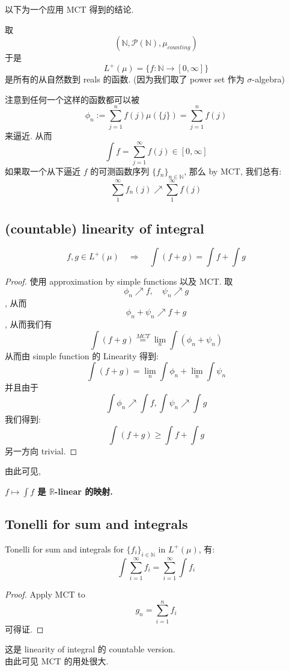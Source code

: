 \documentclass[lang=cn,11pt]{elegantbook}
\begin{document}
以下为一个应用 MCT 得到的结论.

\begin{example}
    取 $$(\mathbb{N}, \mathcal{P}(\mathbb{N}), \mu_{counting})$$
    于是$$L^+(\mu) = \{f:\mathbb{N}\rightarrow [0,\infty]  \}$$
    是所有的从自然数到 reals 的函数. (因为我们取了 power set 作为 $\sigma$-algebra)

   \noindent  注意到任何一个这样的函数都可以被 $$\phi_n :=  \sum_{j=1}^n f(j) \mu(\{j\}) =  \sum_{j=1}^n f(j)   $$ 来逼近. 从而 $$
    \int f = \sum_{j=1}^\infty f(j)  \in [0,\infty]
    $$ 
如果取一个从下逼近 $f$ 的可测函数序列 $\{f_n\}_{n\in\mathbb{N}}$, 那么 by MCT, 我们总有:
$$
\sum_1^\infty f_n (j) \nearrow \sum_1^\infty f (j) 
$$
\end{example}


\subsection{(countable) linearity of integral}
\begin{corollary}
$$f,g \in L^+(\mu) \quad \Longrightarrow \quad \int(f+g) = \int f + \int g$$
\end{corollary}
\begin{proof}
使用 approximation by simple functions 以及 MCT.
取 $$\phi_n \nearrow f, \quad \psi_n \nearrow g$$, 从而 $$\phi_n + \psi_n \nearrow f+g$$, 从而我们有 $$ \int (f+g)  \overset{MCT}{=}  \lim_{n} \int (\phi_n + \psi_n)$$
从而由 simple function 的 Linearity 得到:$$ \int (f+g) = \lim_n\int \phi_n + \lim_n \int \psi_n$$
并且由于 $$ \int \phi_n \nearrow \int f, \int \psi_n \nearrow \int g$$
我们得到:
$$
\int (f+g) \geq \int f + \int g
$$
另一方向 trivial.
\end{proof}


\begin{remark}
    由此可见, \begin{center}
\textbf{$f\mapsto \int f$ 是 $\mathbb{R}$-linear 的映射.}
    \end{center}
\end{remark}

\subsection{Tonelli for sum and integrals}
\begin{corollary}{Tonelli for sum and integrals}
\label{Tonelli for sum and integrals}
for $\{f_i\}_{i\in\mathbb{N}}$ in $L^+(\mu)$, 有:
$$
\int \sum_{i=1}^\infty f_i = \sum_{i=1}^\infty \int f_i
$$
\end{corollary}\begin{proof}
Apply MCT to 
$$
g_n = \sum_{i=1}^n f_i
$$ 可得证.
\end{proof}
\begin{remark}
    这是 linearity of integral 的 countable version.\\
    由此可见 MCT 的用处很大.
\end{remark}
\end{document}
